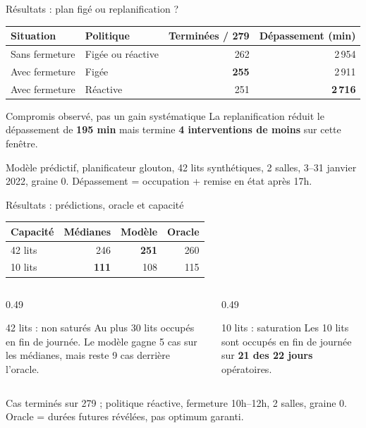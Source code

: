 \documentclass[aspectratio=169,10pt]{beamer}
\newcommand{\source}[1]{\par\vfill{\color{McmMuted}\tiny #1}}
\begin{document}
\begin{frame}{Résultats : plan figé ou replanification ?}
  \small
  \vspace{0.15cm}
  \centering
  \renewcommand{\arraystretch}{1.32}
  \setlength{\tabcolsep}{8pt}
  \begin{tabular}{llrr}
    \toprule
    Situation & Politique & Terminées / 279 & Dépassement (min) \\
    \midrule
    Sans fermeture & Figée ou réactive & 262 & 2\,954 \\
    \midrule
    Avec fermeture & Figée & \textbf{255} & 2\,911 \\
    Avec fermeture & Réactive & 251 & \textbf{2\,716} \\
    \bottomrule
  \end{tabular}
  \vspace{0.35cm}
  \begin{alertblock}{Compromis observé, pas un gain systématique}
    \small La replanification réduit le dépassement de \textbf{195 min}
    mais termine \textbf{4 interventions de moins} sur cette fenêtre.
  \end{alertblock}
  \source{Modèle prédictif, planificateur glouton, 42 lits synthétiques, 2 salles, 3--31 janvier 2022, graine 0. Dépassement = occupation + remise en état après 17h.}
\end{frame}

\begin{frame}{Résultats : prédictions, oracle et capacité}
  \small
  \centering
  \renewcommand{\arraystretch}{1.40}
  \setlength{\tabcolsep}{11pt}
  \begin{tabular}{lrrr}
    \toprule
    Capacité & Médianes & Modèle & Oracle \\
    \midrule
    42 lits & 246 & \textbf{251} & 260 \\
    10 lits & \textbf{111} & 108 & 115 \\
    \bottomrule
  \end{tabular}
  \vspace{0.38cm}
  \begin{columns}[T,onlytextwidth]
    \begin{column}{0.49\textwidth}
      \begin{block}{42 lits : non saturés}
        \small Au plus 30 lits occupés en fin de journée.
        Le modèle gagne 5 cas sur les médianes, mais reste
        9 cas derrière l'oracle.
      \end{block}
    \end{column}
    \begin{column}{0.49\textwidth}
      \begin{alertblock}{10 lits : saturation}
        \small Les 10 lits sont occupés en fin de journée
        sur \textbf{21 des 22 jours} opératoires.
      \end{alertblock}
    \end{column}
  \end{columns}
  \source{Cas terminés sur 279 ; politique réactive, fermeture 10h--12h, 2 salles, graine 0. Oracle = durées futures révélées, pas optimum garanti.}
\end{frame}
\end{document}
